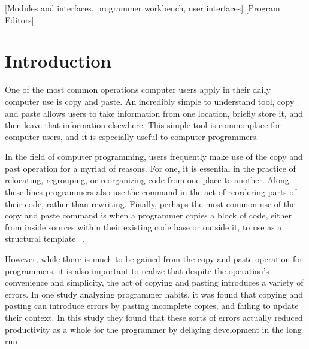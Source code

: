 \documentclass{acm_proc_article-sp}
\begin{document}
[Modules and interfaces, programmer workbench, user interfaces]
[Program Editors]



\section{Introduction}
One of the most common operations computer users apply in their daily computer use is copy and paste. An incredibly simple to understand tool, copy and paste allows users to take information from one location, briefly store it, and then leave that information elsewhere. This simple tool is commonplace for computer users, and it is especially useful to computer programmers.

In the field of computer programming, users frequently make use of the copy and past operation for a myriad of reasons. For one, it is essential in the practice of relocating, regrouping, or reorganizing code from one place to another. Along these lines programmers also use the command in the act of reordering parts of their code, rather than rewriting. Finally, perhaps the most common use of the copy and paste command is when a programmer copies a block of code, either from inside sources within their existing code base or outside it, to use as a structural template ~\cite{ooplCP}.

However, while there is much to be gained from the copy and paste operation for programmers, it is also important to realize that despite the operation's convenience and simplicity, the act of copying and pasting introduces a variety of errors. In one study analyzing programmer habits, it was found that copying and pasting can introduce errors by pasting incomplete copies, and failing to update their context. In this study they found that these sorts of errors actually reduced productivity as a whole for the programmer by delaying development in the long run ~\cite{maintenenceStudy}
\end{document}
